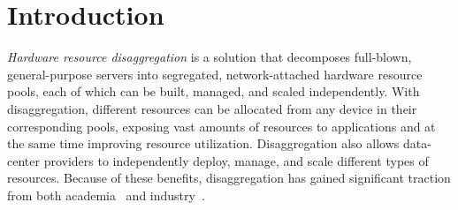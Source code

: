 \section{Introduction}
\label{sec:intro}

{\em Hardware resource disaggregation} is a solution that decomposes full-blown, general-purpose servers into segregated, network-attached hardware resource pools, each of which can be built, managed, and scaled independently. With disaggregation, different resources can be allocated from any device in their corresponding pools, exposing vast amounts of resources to applications and at the same time improving resource utilization. Disaggregation also allows data-center providers to independently deploy, manage, and scale different types of resources.
Because of these benefits, disaggregation has gained significant traction from both academia~\cite{LegoOS,FireBox-FASTKeynote,ATC20-pDPM,Nitu18-EUROSYS,DDC-hotcloud20,aifm-osdi20,semeru,kona,infiniswap,fastswap} and industry~\cite{HP-TheMachine,IntelRackScale,alibaba-polardb,facebook-disaggregation,SnowFlake-NSDI20}.

